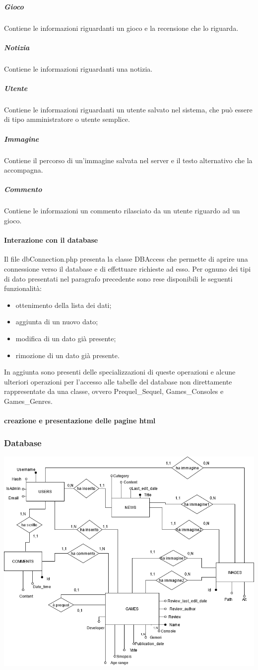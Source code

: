 \subparagraph{Gioco}
Contiene le informazioni riguardanti un gioco e la recensione che lo riguarda.
\subparagraph{Notizia}
Contiene le informazioni riguardanti una notizia.
\subparagraph{Utente}
Contiene le informazioni riguardanti un utente salvato nel sistema, che può essere di tipo amministratore o utente semplice.
\subparagraph{Immagine}
Contiene il percorso di un'immagine salvata nel server e il testo alternativo che la accompagna.
\subparagraph{Commento}
Contiene le informazioni un commento rilasciato da un utente riguardo ad un gioco.

\paragraph{Interazione con il database}
Il file dbConnection.php presenta la classe DBAccess che permette di aprire una connessione verso il database e di effettuare richieste ad esso. Per ognuno dei tipi di dato presentati nel paragrafo precedente sono rese disponibili le seguenti funzionalità:
\begin{itemize}
	\item ottenimento della lista dei dati;
	\item aggiunta di un nuovo dato;
	\item modifica di un dato già presente;
	\item rimozione di un dato già presente. 
\end{itemize}

In aggiunta sono presenti delle specializzazioni di queste operazioni e alcune ulteriori operazioni per l'accesso alle tabelle del database non direttamente rappresentate da una classe, ovvero Prequel\_Sequel, Games\_Consoles e Games\_Genres.

\paragraph{creazione e presentazione delle pagine html}

\subsubsection{Database}


  \includegraphics[width=\linewidth]{./img/diagramma_er.png}
  


